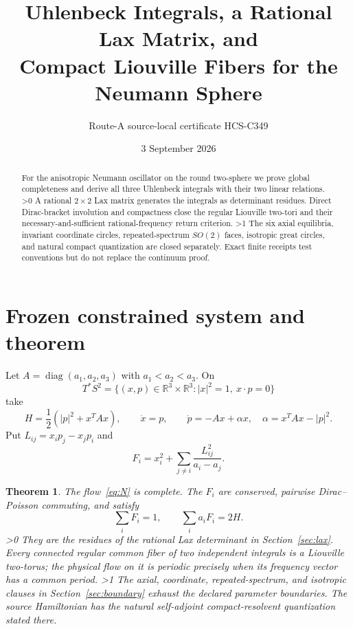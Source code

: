 \documentclass[10pt]{article}
\title{Uhlenbeck Integrals, a Rational Lax Matrix, and\\
Compact Liouville Fibers for the Neumann Sphere}
\author{Route-A source-local certificate HCS-C349}
\date{3 September 2026}
\providecommand{\CRevisionRound}{2}
\newtheorem{theorem}{Theorem}
\newcommand{\RR}{\mathbb R}
\begin{document}
\maketitle
\begin{abstract}
For the anisotropic Neumann oscillator on the round two-sphere we prove
global completeness and derive all three Uhlenbeck integrals with their two
linear relations.
\ifnum\CRevisionRound>0
A rational $2\times2$ Lax matrix generates the integrals as determinant
residues.  Direct Dirac-bracket involution and compactness close the regular
Liouville two-tori and their necessary-and-sufficient rational-frequency
return criterion.
\fi
\ifnum\CRevisionRound>1
The six axial equilibria, invariant coordinate circles, repeated-spectrum
$SO(2)$ faces, isotropic great circles, and natural compact quantization are
closed separately.  Exact finite receipts test conventions but do not
replace the continuum proof.
\fi
\end{abstract}

\section{Frozen constrained system and theorem}
Let $A=\operatorname{diag}(a_1,a_2,a_3)$ with $a_1<a_2<a_3$.  On
\[
 T^*S^2=\{(x,p)\in\RR^3\times\RR^3:|x|^2=1,
                  \ x\mathbin{\cdot}p=0\}
\]
take
\begin{equation}\label{eq:N}
 H=\frac12(|p|^2+x^TAx),\qquad
 \dot x=p,\qquad
 \dot p=-Ax+\alpha x,\quad \alpha=x^TAx-|p|^2.
\end{equation}
Put $L_{ij}=x_ip_j-x_jp_i$ and
\begin{equation}\label{eq:F}
 F_i=x_i^2+\sum_{j\ne i}\frac{L_{ij}^2}{a_i-a_j}.
\end{equation}

\begin{theorem}\label{thm:main}
The flow~\eqref{eq:N} is complete.  The $F_i$ are conserved, pairwise
Dirac--Poisson commuting, and satisfy
\[
 \sum_iF_i=1,\qquad \sum_i a_iF_i=2H.
\]
\ifnum\CRevisionRound>0
They are the residues of the rational Lax determinant in
Section~\ref{sec:lax}.  Every connected regular common fiber of two
independent integrals is a Liouville two-torus; the physical flow on it is
periodic precisely when its frequency vector has a common period.
\fi
\ifnum\CRevisionRound>1
The axial, coordinate, repeated-spectrum, and isotropic clauses in
Section~\ref{sec:boundary} exhaust the declared parameter boundaries.  The
source Hamiltonian has the natural self-adjoint compact-resolvent
quantization stated there.
\fi
\end{theorem}
\end{document}
